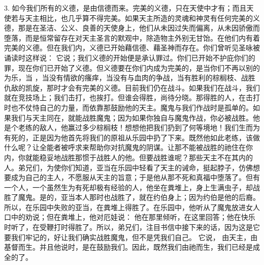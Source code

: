 3.   如今我们所有的义德，是由信德而来。完美的义德，只在天使中才有；而且天使若与天主相比，也几乎算不得完美。如果天主所造的灵魂和神灵有任何完美的义德，那是在圣洁、公义、良善的天使身上，他们从未因过失而偏离，从未因骄傲而堕落，而是恒常留存在对天主圣言的默观中，除造物主外别无甘饴。在他们内有着完美的义德。但在我们内，义德已开始藉信德、藉圣神而存在。你们曾听见圣咏被诵读时这样说：  它说；我们义德的开始便是承认罪过。你们已开始不护庇你们的罪，现在你们已开始了义德。但义德要在你们内成为完美的，是当你们不再以别的为乐，当  ，当没有情欲的瘙痒，当没有与血肉的争战，当有胜利的棕榈枝、战胜仇敌的凯旋，那时才会有完美的义德。目前我们仍在战斗。如果我们在战斗，我们就在竞技场上；我们击打，也挨打。但谁会得胜，尚待分晓。那得胜的人，在击打时也不仗恃自己的力量，而依靠那鼓励他的天主。魔鬼与我们作战时是孤单的。如果我们与天主同在，就能战胜魔鬼；因为如果你独自与魔鬼作战，你必被战胜。他是个老练的敌人，他赢过多少棕榈枝！想想他把我们扔到了何等境地！我们生而为有死的，正是因为他首先将我们的原祖从乐园中扔了下来。既然他如此老练，该做什么呢？让全能者被呼求来帮助你对抗魔鬼的阴谋。让那不能被战胜的祂住在你内，你就能稳妥地战胜那惯于战胜人的他。但要战胜谁呢？那些天主不在其内的人。弟兄们，为使你们知道，亚当在乐园中轻看了天主的诫命，挺起脖子，仿佛想要成为自己的主人，不愿服从天主的旨意；于是他从那不死和真福中堕落了。但有一个人，一个虽然生为有死却极有经验的人，他坐在粪堆上，身上生满虫子，却战胜了魔鬼。是的，亚当本人那时也战胜了，就在约伯身上；因为约伯是他的后裔。所以，在乐园中失败的亚当，在粪堆上得胜了。在乐园中，他听从了魔鬼放进女人口中的劝说；但在粪堆上，他对厄娃说：  他在那里倾听，在这里回答；他在快乐时听了，在受鞭打时得胜了。所以，弟兄们，注目书信中接下来的话，因为这是它要我们牢记的，好让我们确实战胜魔鬼，但不是凭我们自己。 它说， 由天主，由基督而生。并且他说时，是在鼓励我们。因此，既然我们由祂而生，我们已经是成全的了。\par

